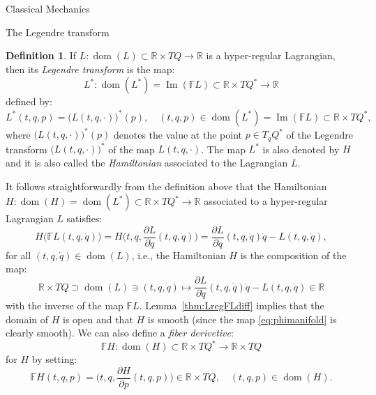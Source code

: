 \documentclass[oneside,a4paper,11pt]{amsbook}
\newcommand{\R}{\mathds R}
\DeclareMathOperator{\Img}{Im}
\DeclareMathOperator{\Dom}{dom}
\theoremstyle{remark}\newtheorem{exercise}{Exercise}[chapter]
\theoremstyle{plain}\newtheorem{teo}{Theorem}[section]
\theoremstyle{plain}\newtheorem{lem}[teo]{Lemma}
\theoremstyle{plain}\newtheorem{prop}[teo]{Proposition}
\theoremstyle{plain}\newtheorem{cor}[teo]{Corollary}
\theoremstyle{definition}\newtheorem{defin}[teo]{Definition}
\theoremstyle{remark}\newtheorem{rem}[teo]{Remark}
\theoremstyle{definition}\newtheorem{notation}[teo]{Notation}
\theoremstyle{definition}\newtheorem{convention}[teo]{Convention}
\theoremstyle{definition}\newtheorem{example}[teo]{Example}
\numberwithin{section}{chapter}
\numberwithin{equation}{section}
\begin{document}
\begin{chapter}{Classical Mechanics}
\begin{section}{The Legendre transform}
\begin{defin}
If $L:\Dom(L)\subset\R\times TQ\to\R$ is a hyper-regular Lagrangian, then its {\em Legendre transform\/} is the map:
\[L^*:\Dom(L^*)=\Img(\mathbb FL)\subset\R\times TQ^*\longrightarrow\R\]
defined by:
\[L^*(t,q,p)=\big(L(t,q,\cdot)\big)^*(p),\quad(t,q,p)\in\Dom(L^*)=\Img(\mathbb FL)\subset\R\times TQ^*,\]
where $\big(L(t,q,\cdot)\big)^*(p)$ denotes the value at the point $p\in T_qQ^*$ of the Legendre transform $\big(L(t,q,\cdot)\big)^*$
of the map $L(t,q,\cdot)$. The map $L^*$ is also denoted by $H$ and it is also called the {\em Hamiltonian\/} associated to the Lagrangian $L$.
\end{defin}
It follows straightforwardly from the definition above that the Hamiltonian $H:\Dom(H)=\Dom(L^*)\subset\R\times TQ^*\to\R$ associated to a hyper-regular Lagrangian
$L$ satisfies:
\[H\big(\mathbb FL(t,q,\dot q)\big)=H\Big(t,q,\frac{\partial L}{\partial\dot q}(t,q,\dot q)\Big)=
\frac{\partial L}{\partial\dot q}(t,q,\dot q)\dot q-L(t,q,\dot q),\]
for all $(t,q,\dot q)\in\Dom(L)$, i.e., the Hamiltonian $H$ is the composition of the map:
\begin{equation}\label{eq:phimanifold}
\R\times TQ\supset\Dom(L)\ni(t,q,\dot q)\longmapsto\frac{\partial L}{\partial\dot q}(t,q,\dot q)\dot q-L(t,q,\dot q)\in\R
\end{equation}
with the inverse of the map $\mathbb FL$. Lemma~\ref{thm:LregFLdiff} implies that the domain of $H$ is open and that $H$ is smooth
(since the map \eqref{eq:phimanifold} is clearly smooth). We can also define a {\em fiber derivetive}:
\[\mathbb FH:\Dom(H)\subset\R\times TQ^*\longrightarrow\R\times TQ\]
for $H$ by setting:
\[\mathbb FH(t,q,p)=\Big(t,q,\frac{\partial H}{\partial p}(t,q,p)\Big)\in\R\times TQ,\quad(t,q,p)\in\Dom(H).\]


\end{section}
\end{chapter}
\end{document}
